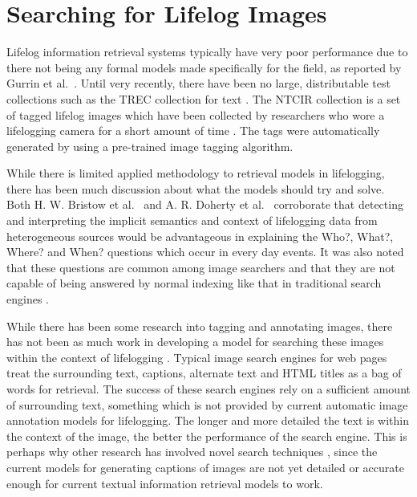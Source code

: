 \section{Searching for Lifelog Images}
Lifelog information retrieval systems typically have very poor performance due to there not being any formal models made specifically for the field, as reported by Gurrin et al.~\cite{gurrin2014lifelogging}. Until very recently, there have been no large, distributable test collections such as the TREC collection for text \cite{gurrin2014lifelogging}. The NTCIR collection is a set of tagged lifelog images which have been collected by researchers who wore a lifelogging camera for a short amount of time \cite{gurrin2016ntcir}. The tags were automatically generated by using a pre-trained image tagging algorithm.

While there is limited applied methodology to retrieval models in lifelogging, there has been much discussion about what the models should try and solve. Both H.  W.  Bristow et al.~\cite{bristow2004defining} and A. R. Doherty et al.~\cite{doherty2010automatically} corroborate that detecting and interpreting the implicit semantics and context of lifelogging data from heterogeneous sources would be advantageous in explaining the Who?, What?, Where? and When? questions which occur in every day events. It was also noted that these questions are common among image searchers and that they are not capable of being answered by normal indexing like that in traditional search engines \cite{ali2010semantically}.

While there has been some research into tagging and annotating images, there has not been as much work in developing a model for searching these images within the context of lifelogging \cite{gurrin2014lifelogging}. Typical image search engines for web pages treat the surrounding text, captions, alternate text and HTML titles \cite{frankel1996webseer} as a bag of words for retrieval. The success of these search engines rely on a sufficient amount of surrounding text, something which is not provided by current automatic image annotation models for lifelogging. The longer and more detailed the text is within the context of the image, the better the performance of the search engine. This is perhaps why other research has involved novel search techniques \cite{vuurpij2002vind}, since the current models for generating captions of images are not yet detailed or accurate enough for current textual information retrieval models to work.

